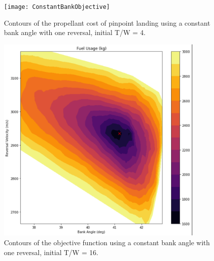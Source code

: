 \documentclass[letterpaper, preprint, paper,11pt]{AAS}
\begin{document}
\begin{figure}[h!]
		\centering
		\texttt{[image: ConstantBankObjective]} 
		\caption{Contours of the propellant cost of pinpoint landing using a constant bank angle with one reversal, initial T/W = 4.}
\end{figure}
\begin{figure}[h!]
		\centering
		\includegraphics[width=0.9\textwidth]{Profile1_Objective} 
		\caption{Contours of the objective function using a constant bank angle with one reversal, initial T/W = 16.}
\end{figure}
%
\end{document}
